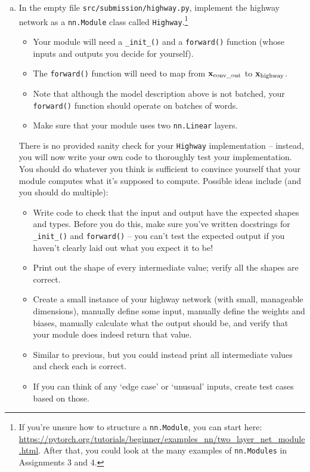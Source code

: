 \begin{enumerate}[(a)]
    \item \label{qn:highway} In the empty file \texttt{src/submission/highway.py}, implement the highway network as a \texttt{nn.Module} class called \texttt{Highway}.\footnote{If you're unsure how to structure a \texttt{nn.Module}, you can start here: \url{https://pytorch.org/tutorials/beginner/examples_nn/two_layer_net_module.html}. After that, you could look at the many examples of \texttt{nn.Modules} in Assignments 3 and 4.} 
    \begin{itemize}
        \item Your module will need a \texttt{\_init\_()} and a \texttt{forward()} function (whose inputs and outputs you decide for yourself).
        \item The \texttt{forward()} function will need to map from $\mathbf{x}_\text{conv\_out}$ to $\mathbf{x}_\text{highway}$.
        \item Note that although the model description above is not batched, your \texttt{forward()} function should operate on batches of words.
        \item Make sure that your module uses two \texttt{nn.Linear} layers.
    \end{itemize}
    There is no provided sanity check for your \texttt{Highway} implementation -- instead, you will now write your own code to thoroughly test your implementation. 
    You should do whatever you think is sufficient to convince yourself that your module computes what it's supposed to compute. 
    Possible ideas include (and you should do multiple):
    \begin{itemize}
        \item Write code to check that the input and output have the expected shapes and types. Before you do this, make sure you've written docstrings for \texttt{\_init\_()} and \texttt{forward()} -- you can't test the expected output if you haven't clearly laid out what you expect it to be!
        \item Print out the shape of every intermediate value; verify all the shapes are correct.
        \item Create a small instance of your highway network (with small, manageable dimensions), manually define some input, manually define the weights and biases, manually calculate what the output should be, and verify that your module does indeed return that value.
        \item Similar to previous, but you could instead print all intermediate values and check each is correct.
        \item If you can think of any `edge case' or `unusual' inputs, create test cases based on those.
    \end{itemize}
        

\end{enumerate}
